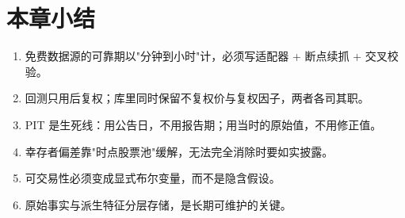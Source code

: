 \section{本章小结}

\begin{enumerate}
  \item 免费数据源的可靠期以"分钟到小时"计，必须写适配器 + 断点续抓 + 交叉校验。
  \item 回测只用后复权；库里同时保留不复权价与复权因子，两者各司其职。
  \item PIT 是生死线：用公告日，不用报告期；用当时的原始值，不用修正值。
  \item 幸存者偏差靠"时点股票池"缓解，无法完全消除时要如实披露。
  \item 可交易性必须变成显式布尔变量，而不是隐含假设。
  \item 原始事实与派生特征分层存储，是长期可维护的关键。
\end{enumerate}
